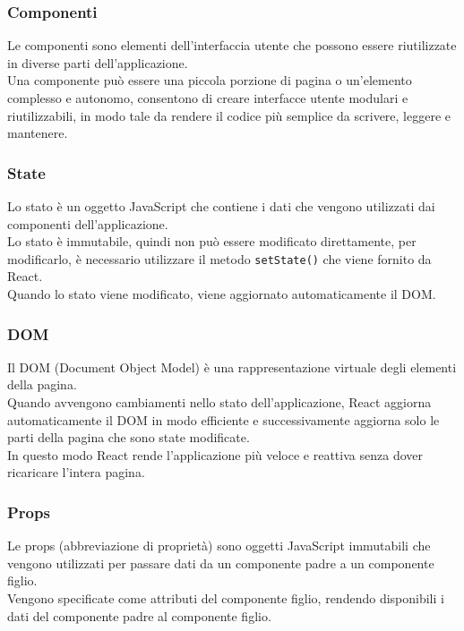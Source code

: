 \subsubsection{Componenti}
Le componenti sono elementi dell'interfaccia utente che possono essere riutilizzate in diverse parti dell'applicazione.\\
Una componente può essere una piccola porzione di pagina o un'elemento complesso e autonomo, consentono di creare interfacce utente modulari e riutilizzabili, in modo tale da rendere il codice più semplice da scrivere, leggere e mantenere.\\
\subsubsection{State}
Lo stato è un oggetto JavaScript che contiene i dati che vengono utilizzati dai componenti dell'applicazione.\\
Lo stato è immutabile, quindi non può essere modificato direttamente, per modificarlo, è necessario utilizzare il metodo \texttt{setState()} che viene fornito da React.\\
Quando lo stato viene modificato, viene aggiornato automaticamente il DOM.\\
\subsubsection{DOM}
Il DOM (Document Object Model) è una rappresentazione virtuale degli elementi della pagina.\\
Quando avvengono cambiamenti nello stato dell'applicazione, React aggiorna automaticamente il DOM in modo efficiente e successivamente aggiorna solo le parti della pagina che sono state modificate.\\
In questo modo React rende l'applicazione più veloce e reattiva senza dover ricaricare l'intera pagina.\\

\subsubsection{Props}
Le props (abbreviazione di proprietà) sono oggetti JavaScript immutabili che vengono utilizzati per passare dati da un componente padre a un componente figlio.\\
Vengono specificate come attributi del componente figlio, rendendo disponibili i dati del componente padre al componente figlio.\\

